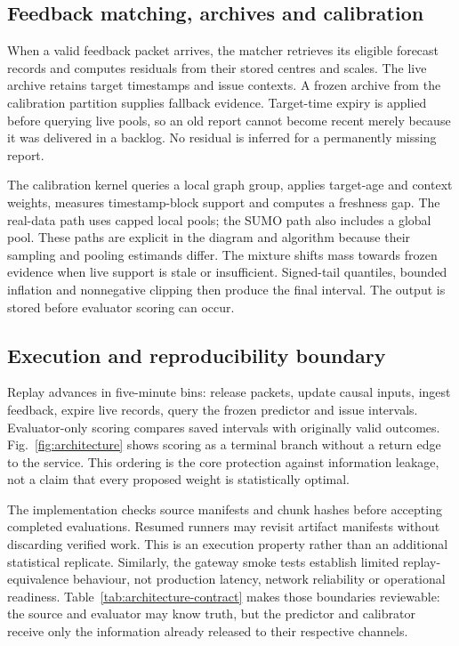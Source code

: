 \documentclass[pdflatex,sn-mathphys-num]{sn-jnl}
\newcounter{algorithm}
\begin{document}
\subsection{Feedback matching, archives and calibration}
When a valid feedback packet arrives, the matcher retrieves its eligible forecast records and computes residuals from their stored centres and scales. The live archive retains target timestamps and issue contexts. A frozen archive from the calibration partition supplies fallback evidence. Target-time expiry is applied before querying live pools, so an old report cannot become recent merely because it was delivered in a backlog. No residual is inferred for a permanently missing report.

The calibration kernel queries a local graph group, applies target-age and context weights, measures timestamp-block support and computes a freshness gap. The real-data path uses capped local pools; the SUMO path also includes a global pool. These paths are explicit in the diagram and algorithm because their sampling and pooling estimands differ. The mixture shifts mass towards frozen evidence when live support is stale or insufficient. Signed-tail quantiles, bounded inflation and nonnegative clipping then produce the final interval. The output is stored before evaluator scoring can occur.

\subsection{Execution and reproducibility boundary}
Replay advances in five-minute bins: release packets, update causal inputs, ingest feedback, expire live records, query the frozen predictor and issue intervals. Evaluator-only scoring compares saved intervals with originally valid outcomes. Fig.~\ref{fig:architecture} shows scoring as a terminal branch without a return edge to the service. This ordering is the core protection against information leakage, not a claim that every proposed weight is statistically optimal.

The implementation checks source manifests and chunk hashes before accepting completed evaluations. Resumed runners may revisit artifact manifests without discarding verified work. This is an execution property rather than an additional statistical replicate. Similarly, the gateway smoke tests establish limited replay-equivalence behaviour, not production latency, network reliability or operational readiness. Table~\ref{tab:architecture-contract} makes those boundaries reviewable: the source and evaluator may know truth, but the predictor and calibrator receive only the information already released to their respective channels.
\end{document}
